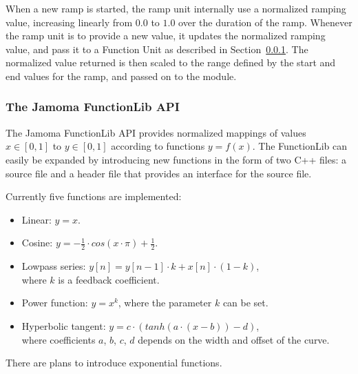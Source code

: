 \documentclass{sig-alternate}
\begin{document}
When a new ramp is started, the ramp unit internally use a normalized ramping value, increasing linearly from $0.0$ to $1.0$ over the duration of the ramp. Whenever the ramp unit is to provide a new value, it updates the normalized ramping value, and pass it to a Function Unit as described in Section~\ref{ssub:the_function_lib}. The normalized value returned is then scaled to the range defined by the start and end values for the ramp, and passed on to the module.



\subsubsection{The Jamoma FunctionLib API} %
\label{ssub:the_function_lib}

The Jamoma FunctionLib API provides normalized mappings of values $x \in [0,1]$ to $y \in [0,1]$ according to functions $y = f(x)$. The FunctionLib can easily be expanded by introducing new functions in the form of two C++ files: a source file and a header file that provides an interface for the source file.

Currently five functions are implemented: 

\begin{itemize}

	\item Linear: $y = x$.

	\item Cosine: $y = - \frac{1}{2} \cdot cos(x \cdot \pi ) + \frac{1}{2} $.

	\item Lowpass series: $y[n] = y[n-1] \cdot k + x[n] \cdot (1-k)$, \\ where $k$ is a feedback coefficient.

	\item Power function: $ y = x^{k} $, where the parameter $k$ can be set.

	\item Hyperbolic tangent: $ y = c \cdot (tanh(a\cdot(x-b)) - d) $, \\ where coefficients $a$, $b$, $c$, $d$ depends on the width and offset of the curve.
	
\end{itemize}

There are plans to introduce exponential functions.

\end{document}
